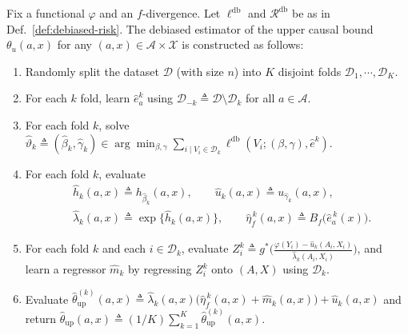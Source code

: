 \begin{definition}\label{def:cross-fit}
    \normalfont
    Fix a functional $\varphi$ and an $f$-divergence. Let $\ell^{\mathrm{db}}$ and $\mathcal{R}^{\mathrm{db}}$ be as in Def.~\ref{def:debiased-risk}. The debiased estimator of the upper causal bound $\theta_{u}(a,x)$ for any $(a,x) \in \mathcal{A} \times \mathcal{X}$ is constructed as follows:
    \begin{enumerate}[leftmargin=*]
        \item Randomly split the dataset $\mathcal{D}$ (with size $n$) into $K$ disjoint folds  $\mathcal{D}_1,\cdots,\mathcal{D}_K$. 
        \item For each $k$ fold, learn $\widehat{e}^{k}_a$ using $\mathcal{D}_{-k} \triangleq \mathcal{D} \setminus \mathcal{D}_{k}$ for all $a \in \mathcal{A}$.
        \item For each fold $k$, solve $\widehat{\vartheta}_k \triangleq (\hat \beta_k,\hat \gamma_k) \in \arg\min_{\beta, \gamma} \sum_{i \mid V_i \in \mathcal{D}_k} \ell^{\mathrm{db}}(V_i; (\beta,\gamma),\widehat{e}^k)$. 
        \item For each fold $k$, evaluate 
        \begin{align}
            & \widehat h_k(a,x) \triangleq h_{\widehat\beta_k}(a,x),\qquad \widehat u_k(a,x) \triangleq u_{\widehat\gamma_k}(a,x),\\ 
            &\widehat\lambda_k(a,x) \triangleq \exp\{\widehat h_k(a,x)\}, \qquad  \widehat\eta^{\,k}_f(a,x) \triangleq B_f\big(\widehat e^{\,k}_a(x)).
        \end{align}
        \item For each fold $k$ and each $i \in \mathcal{D}_k$, evaluate $Z^{k}_i \triangleq g^{\ast}\big(\tfrac{\varphi(Y_i) - \widehat u_k(A_i,X_i)}{\widehat\lambda_k(A_i,X_i)}\big)$, and learn a regressor $\widehat{m}_{k} $ by regressing $Z^{k}_i$ onto $(A,X)$ using $\mathcal{D}_k$. 
        \item Evaluate $\widehat{\theta}^{(k)}_{\mathrm{up}}(a,x) \triangleq \widehat\lambda_k(a,x)\big(
        \widehat\eta^{\,k}_f(a,x) + \widehat m_k(a,x) \big) + \widehat u_k(a,x)$ and return $\widehat{\theta}_{\mathrm{up}}(a,x)  \triangleq (1/K)\sum_{k=1}^{K}\widehat{\theta}^{(k)}_{\mathrm{up}}(a,x) $.
    \end{enumerate}
\end{definition}

